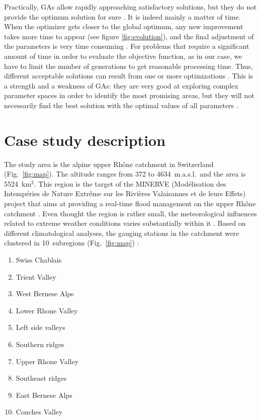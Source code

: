 \documentclass[5p]{elsarticle}
\begin{document}


Practically, GAs allow rapidly approaching satisfactory solutions, but they do not provide the optimum solution for sure \citep{Zitzler2004a}. It is indeed mainly a matter of time. When the optimizer gets closer to the global optimum, any new improvement takes more time to appear (see figure \ref{fig:evolution}), and the final adjustment of the parameters is very time consuming \citep{Back1993a}. For problems that require a significant amount of time in order to evaluate the objective function, as in our case, we have to limit the number of generations to get reasonable processing time. Thus, different acceptable solutions can result from one or more optimizations \citep{Holland1992b}. This is a strength and a weakness of GAs: they are very good at exploring complex parameter spaces in order to identify the most promising areas, but they will not necessarily find the best solution with the optimal values of all parameters \citep{Holland1992b}.







\section{Case study description}

The study area is the alpine upper Rh\^{o}ne catchment in Switzerland (Fig.\ \ref{fig:map}). The altitude ranges from 372 to 4634~m.a.s.l.\ and the area is 5524~km$^{2}$. This region is the target of the MINERVE (Mod\'{e}lisation des Intemp\'{e}ries de Nature Extr\^{e}me sur les Rivi\`{e}res Valaisannes et de leurs Effets) project that aims at providing a real-time flood management on the upper Rh\^{o}ne catchment \citep{GarciaHernandez2009b}. Even thought the region is rather small, the meteorological influences related to extreme weather conditions varies substantially within it \citep[see][]{Horton2012}. Based on different climatological analyses, the gauging stations in the catchment were clustered in 10~subregions (Fig.\ \ref{fig:map}) :

\begin{enumerate}
	\item Swiss Chablais
	\item Trient Valley
	\item West Bernese Alps
	\item Lower Rhone Valley
	\item Left side valleys
	\item Southern ridges
	\item Upper Rhone Valley
	\item Southeast ridges
	\item East Bernese Alps
	\item Conches Valley
\end{enumerate}
\end{document}
